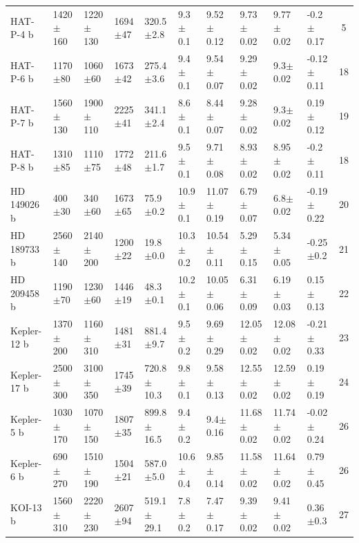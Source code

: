 \begin{subappendices}
{\begin{landscape}
\begin{longtable}{llllllllllc}
  HAT-P-4 b   &    1420$\pm$160 &    1220$\pm$130 &   1694$\pm$47 &    320.5$\pm$2.8 &   9.3$\pm$0.1 &   9.52$\pm$0.12 &   9.73$\pm$0.02 &   9.77$\pm$0.02 &   -0.2$\pm$0.17 &        5 \\
  HAT-P-6 b   &     1170$\pm$80 &     1060$\pm$60 &   1673$\pm$42 &    275.4$\pm$3.6 &   9.4$\pm$0.1 &   9.54$\pm$0.07 &   9.29$\pm$0.02 &    9.3$\pm$0.02 &  -0.12$\pm$0.11 &       18 \\
  HAT-P-7 b   &    1560$\pm$130 &    1900$\pm$110 &   2225$\pm$41 &    341.1$\pm$2.4 &   8.6$\pm$0.1 &   8.44$\pm$0.07 &   9.28$\pm$0.02 &    9.3$\pm$0.02 &   0.19$\pm$0.12 &       19 \\
  HAT-P-8 b   &     1310$\pm$85 &     1110$\pm$75 &   1772$\pm$48 &    211.6$\pm$1.7 &   9.5$\pm$0.1 &   9.71$\pm$0.08 &   8.93$\pm$0.02 &   8.95$\pm$0.02 &   -0.2$\pm$0.11 &       18 \\
  HD 149026 b &      400$\pm$30 &      340$\pm$60 &   1673$\pm$65 &     75.9$\pm$0.2 &  10.9$\pm$0.1 &  11.07$\pm$0.19 &   6.79$\pm$0.07 &    6.8$\pm$0.02 &  -0.19$\pm$0.22 &       20 \\
  HD 189733 b &    2560$\pm$140 &    2140$\pm$200 &   1200$\pm$22 &     19.8$\pm$0.0 &  10.3$\pm$0.2 &  10.54$\pm$0.11 &   5.29$\pm$0.15 &   5.34$\pm$0.05 &   -0.25$\pm$0.2 &       21 \\
  HD 209458 b &     1190$\pm$70 &     1230$\pm$60 &   1446$\pm$19 &     48.3$\pm$0.1 &  10.2$\pm$0.1 &  10.05$\pm$0.06 &   6.31$\pm$0.09 &   6.19$\pm$0.03 &   0.15$\pm$0.13 &       22 \\
  Kepler-12 b &    1370$\pm$200 &    1160$\pm$310 &   1481$\pm$31 &    881.4$\pm$9.7 &   9.5$\pm$0.2 &   9.69$\pm$0.29 &  12.05$\pm$0.02 &  12.08$\pm$0.02 &  -0.21$\pm$0.33 &       23 \\
  Kepler-17 b &    2500$\pm$300 &    3100$\pm$350 &   1745$\pm$39 &   720.8$\pm$10.3 &   9.8$\pm$0.1 &   9.58$\pm$0.13 &  12.55$\pm$0.02 &  12.59$\pm$0.02 &   0.19$\pm$0.19 &       24 \\
  Kepler-5 b  &    1030$\pm$170 &    1070$\pm$150 &   1807$\pm$35 &   899.8$\pm$16.5 &   9.4$\pm$0.2 &    9.4$\pm$0.16 &  11.68$\pm$0.02 &  11.74$\pm$0.02 &  -0.02$\pm$0.24 &       26 \\
  Kepler-6 b  &     690$\pm$270 &    1510$\pm$190 &   1504$\pm$21 &    587.0$\pm$5.0 &  10.6$\pm$0.4 &   9.85$\pm$0.14 &  11.58$\pm$0.02 &  11.64$\pm$0.02 &   0.79$\pm$0.45 &       26 \\
  KOI-13 b    &    1560$\pm$310 &    2220$\pm$230 &   2607$\pm$94 &   519.1$\pm$29.1 &   7.8$\pm$0.2 &   7.47$\pm$0.17 &   9.39$\pm$0.02 &   9.41$\pm$0.02 &    0.36$\pm$0.3 &       27 \\

\end{longtable}
\end{landscape}}
\end{subappendices}
